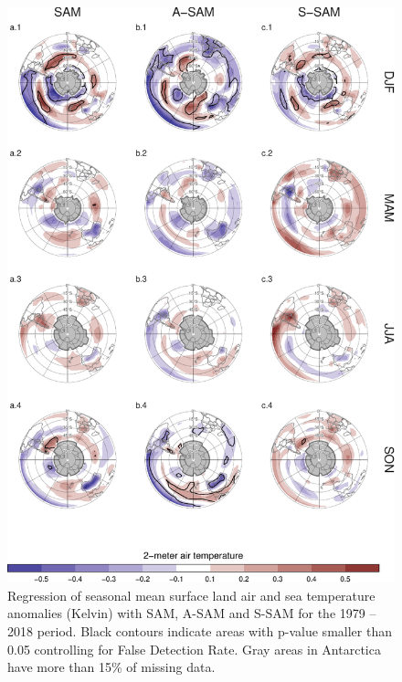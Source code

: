 \documentclass[smallextended]{svjour3}       %
\begin{document}
\begin{figure}
\includegraphics{A10-1} \caption{Regression of seasonal mean surface land air and sea temperature anomalies (Kelvin) with SAM, A\nobreakdash-SAM and S\nobreakdash-SAM for the 1979 -- 2018 period. Black contours indicate areas with p-value smaller than 0.05 controlling for False Detection Rate. Gray areas in Antarctica have more than 15\% of missing data.}\label{fig:A10}
\end{figure}

\newpage




\end{document}
